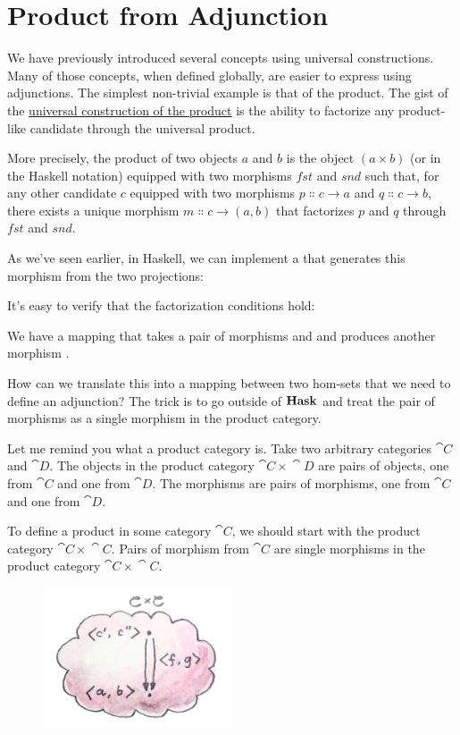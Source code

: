 \section{Product from Adjunction}

We have previously introduced several concepts using universal
constructions. Many of those concepts, when defined globally, are easier
to express using adjunctions. The simplest non-trivial example is that
of the product. The gist of the \hyperref[products-and-coproducts]{universal
  construction of the product} is the ability to factorize any
product-like candidate through the universal product.

More precisely, the product of two objects $a$ and $b$ is
the object $(a\times{}b)$ (or  in the Haskell
notation) equipped with two morphisms $\mathit{fst}$ and $\mathit{snd}$ such
that, for any other candidate $c$ equipped with two morphisms
$p \Colon c \to a$ and $q \Colon c \to b$, there
exists a unique morphism $m \Colon c \to (a, b)$ that
factorizes $p$ and $q$ through $\mathit{fst}$ and $\mathit{snd}$.

As we've seen earlier, in Haskell, we can implement a  that generates this
morphism from the two projections:

It's easy to verify that the factorization conditions hold:

We have a mapping that takes a pair of morphisms  and
 and produces another morphism
.

How can we translate this into a mapping between two hom-sets that we
need to define an adjunction? The trick is to go outside of
$\mathbf{Hask}$ and treat the pair of morphisms as a single morphism in
the product category.

Let me remind you what a product category is. Take two arbitrary
categories $\cat{C}$ and $\cat{D}$. The objects in the product category
$\cat{C}\times{}\cat{D}$ are pairs of objects, one from $\cat{C}$ and one from
$\cat{D}$. The morphisms are pairs of morphisms, one from $\cat{C}$ and
one from $\cat{D}$.

To define a product in some category $\cat{C}$, we should start with the
product category $\cat{C}\times{}\cat{C}$. Pairs of morphism from $\cat{C}$ are single
morphisms in the product category $\cat{C}\times{}\cat{C}$.

\begin{figure}[H]
  \centering
  \includegraphics[width=0.5\textwidth]{images/adj-productcat.jpg}
\end{figure}

